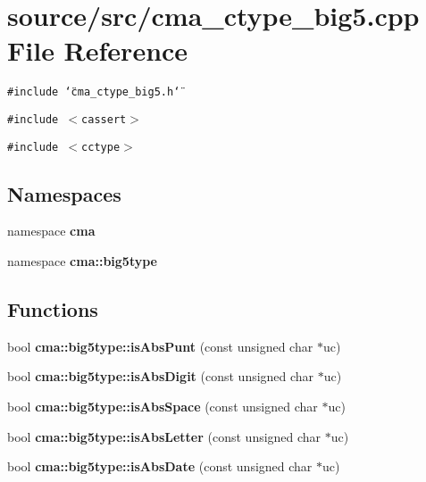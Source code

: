 \section{source/src/cma\_\-ctype\_\-big5.cpp File Reference}
\label{cma__ctype__big5_8cpp}
{\tt \#include \char`\"{}cma\_\-ctype\_\-big5.h\char`\"{}}\par
{\tt \#include $<$cassert$>$}\par
{\tt \#include $<$cctype$>$}\par
\subsection*{Namespaces}
\begin{CompactItemize}
\item 
namespace \textbf{cma}
\item 
namespace \textbf{cma::big5type}
\end{CompactItemize}
\subsection*{Functions}
\begin{CompactItemize}
\item 
bool {\bf cma::big5type::isAbsPunt} (const unsigned char $\ast$uc)
\item 
bool {\bf cma::big5type::isAbsDigit} (const unsigned char $\ast$uc)
\item 
bool {\bf cma::big5type::isAbsSpace} (const unsigned char $\ast$uc)
\item 
bool {\bf cma::big5type::isAbsLetter} (const unsigned char $\ast$uc)
\item 
bool {\bf cma::big5type::isAbsDate} (const unsigned char $\ast$uc)
\end{CompactItemize}
